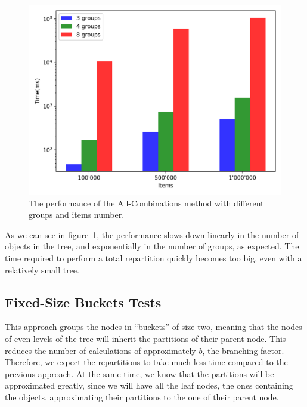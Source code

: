 \begin{figure}[!htb]
  \centering
  \includegraphics[width=\textwidth,height=\textheight,keepaspectratio]{img/all.png}
  \caption[caption]{The performance of the All-Combinations method with different groups and items number.}
  \label{fig:all}
\end{figure}

As we can see in figure~\ref{fig:all}, the performance slows down linearly in the number of objects in the tree, and exponentially in the number of groups, as expected. The time required to perform a total repartition quickly becomes too big, even with a relatively small tree.

\subsection{Fixed-Size Buckets Tests}\label{sec:Fixed-Size buckets-tests}
This approach groups the nodes in ``buckets'' of size two, meaning that the nodes of even levels of the tree will inherit the partitions of their parent node. This reduces the number of calculations of approximately $b$, the branching factor. Therefore, we expect the repartitions to take much less time compared to the previous approach. At the same time, we know that the partitions will be approximated greatly, since we will have all the leaf nodes, the ones containing the objects, approximating their partitions to the one of their parent node.

